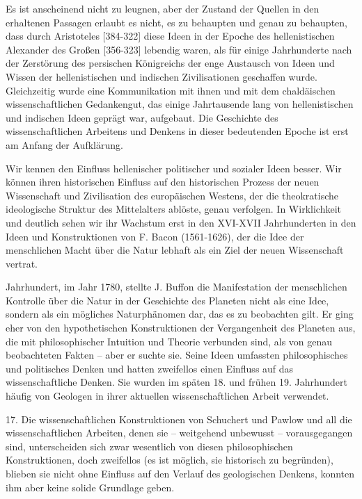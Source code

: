 \documentclass[11pt,a4paper]{book}
\begin{document}
Es ist anscheinend nicht zu leugnen, aber der Zustand der Quellen in den erhaltenen Passagen erlaubt es nicht, es zu behaupten und genau zu behaupten, dass durch Aristoteles [384-322] diese Ideen in der Epoche des hellenistischen Alexander des Großen [356-323] lebendig waren, als für einige Jahrhunderte nach der Zerstörung des persischen Königreichs der enge Austausch von Ideen und Wissen der hellenistischen und indischen Zivilisationen geschaffen wurde. Gleichzeitig wurde eine Kommunikation mit ihnen und mit dem chaldäischen wissenschaftlichen Gedankengut, das einige Jahrtausende lang von hellenistischen und indischen Ideen geprägt war, aufgebaut. Die Geschichte des wissenschaftlichen Arbeitens und Denkens in dieser bedeutenden Epoche ist erst am Anfang der Aufklärung. 

Wir kennen den Einfluss hellenischer politischer und sozialer Ideen besser. Wir können ihren historischen Einfluss auf den historischen Prozess der neuen Wissenschaft und Zivilisation des europäischen Westens, der die theokratische ideologische Struktur des Mittelalters ablöste, genau verfolgen. In Wirklichkeit und deutlich sehen wir ihr Wachstum erst in den XVI-XVII Jahrhunderten in den Ideen und Konstruktionen von F. Bacon (1561-1626), der die Idee der menschlichen Macht über die Natur lebhaft als ein Ziel der neuen Wissenschaft vertrat. 

Jahrhundert, im Jahr 1780, stellte J. Buffon die Manifestation der menschlichen Kontrolle über die Natur in der Geschichte des Planeten nicht als eine Idee, sondern als ein mögliches Naturphänomen dar, das es zu beobachten gilt. Er ging eher von den hypothetischen Konstruktionen der Vergangenheit des Planeten aus, die mit philosophischer Intuition und Theorie verbunden sind, als von genau beobachteten Fakten -- aber er suchte sie. Seine Ideen umfassten philosophisches und politisches Denken und hatten zweifellos einen Einfluss auf das wissenschaftliche Denken. Sie wurden im späten 18. und frühen 19. Jahrhundert häufig von Geologen in ihrer aktuellen wissenschaftlichen Arbeit verwendet. 

17. Die wissenschaftlichen Konstruktionen von Schuchert und Pawlow und all die wissenschaftlichen Arbeiten, denen sie -- weitgehend unbewusst -- vorausgegangen sind, unterscheiden sich zwar wesentlich von diesen philosophischen Konstruktionen, doch zweifellos (es ist möglich, sie historisch zu begründen), blieben sie nicht ohne Einfluss auf den Verlauf des geologischen Denkens, konnten ihm aber keine solide Grundlage geben. 
\end{document}
